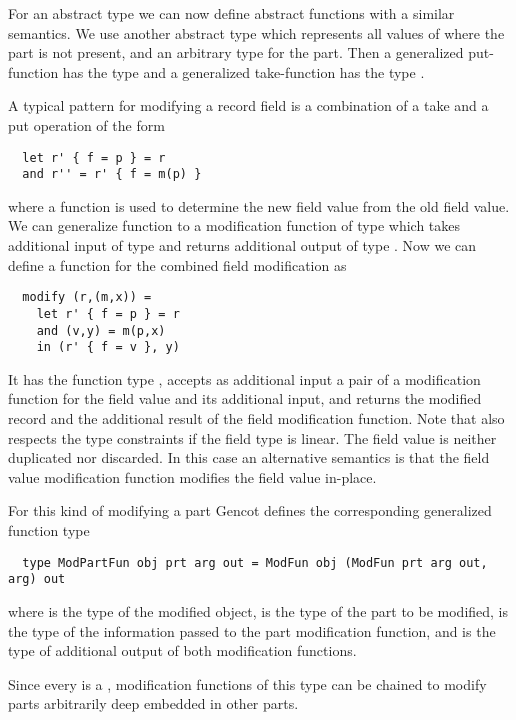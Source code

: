 For an abstract type  we can now define abstract functions with a similar semantics. We use another abstract type 
which represents all values of  where the part is not present, and an arbitrary type  for the part. Then
a generalized put-function has the type  and a generalized take-function has the type
.

A typical pattern for modifying a record field is a combination of a take and a put operation of the form
\begin{verbatim}
  let r' { f = p } = r 
  and r'' = r' { f = m(p) }
\end{verbatim}
where a function  is used to determine the new field value from the old field value. We can generalize function
 to a modification function of type  which takes additional input of type  and
returns additional output of type . Now we can define a function for the combined field modification as
\begin{verbatim}
  modify (r,(m,x)) = 
    let r' { f = p } = r
    and (v,y) = m(p,x)
    in (r' { f = v }, y)
\end{verbatim}
It has the function type , accepts as additional input a pair of a modification
function for the field value and its additional input, and returns the modified record and the additional result of
the field modification function. Note that  also respects the type constraints if the field type 
is linear. The field value is neither duplicated nor discarded. In this case an alternative semantics is that the field 
value modification function  modifies the field value in-place.

For this kind of modifying a part Gencot defines the corresponding generalized function type
\begin{verbatim}
  type ModPartFun obj prt arg out = ModFun obj (ModFun prt arg out, arg) out
\end{verbatim}
where  is the type of the modified object,  is the type of the part to be modified,  is the type
of the information passed to the part modification function, and  is the type of additional output of both modification functions.

Since every  is a , modification functions of this type can be chained to modify parts arbitrarily 
deep embedded in other parts. 

